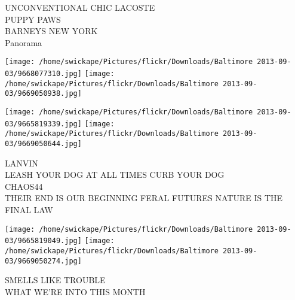 \documentclass[10pt,letterpaper]{article}
\begin{document}
UNCONVENTIONAL CHIC LACOSTE\\
PUPPY PAWS\\
BARNEYS NEW YORK\\
Panorama
\pagebreak

\texttt{[image: /home/swickape/Pictures/flickr/Downloads/Baltimore 2013-09-03/9668077310.jpg]}
\texttt{[image: /home/swickape/Pictures/flickr/Downloads/Baltimore 2013-09-03/9669050938.jpg]}

\texttt{[image: /home/swickape/Pictures/flickr/Downloads/Baltimore 2013-09-03/9665819339.jpg]}
\texttt{[image: /home/swickape/Pictures/flickr/Downloads/Baltimore 2013-09-03/9669050644.jpg]}

LANVIN\\
LEASH YOUR DOG AT ALL TIMES CURB YOUR DOG\\
CHAOS44\\
THEIR END IS OUR BEGINNING FERAL FUTURES NATURE IS THE FINAL LAW
\pagebreak

\texttt{[image: /home/swickape/Pictures/flickr/Downloads/Baltimore 2013-09-03/9665819049.jpg]}
\texttt{[image: /home/swickape/Pictures/flickr/Downloads/Baltimore 2013-09-03/9669050274.jpg]}

SMELLS LIKE TROUBLE\\
WHAT WE'RE INTO THIS MONTH
\pagebreak
\end{document}
